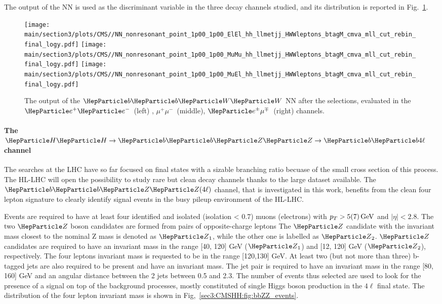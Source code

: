 The output of the NN is used as the discriminant variable in the three decay channels studied, and its distribution is reported in Fig.~\ref{sec3:CMSHH:fig:bbWW_events}.

\begin{figure}[!htb]
  \begin{center}
    \texttt{[image: \\main/section3/plots/CMS//NN\_nonresonant\_point\_1p00\_1p00\_ElEl\_hh\_llmetjj\_HWWleptons\_btagM\_cmva\_mll\_cut\_rebin\_final\_logy.pdf]}
    \texttt{[image: \\main/section3/plots/CMS//NN\_nonresonant\_point\_1p00\_1p00\_MuMu\_hh\_llmetjj\_HWWleptons\_btagM\_cmva\_mll\_cut\_rebin\_final\_logy.pdf]}
    \texttt{[image: \\main/section3/plots/CMS//NN\_nonresonant\_point\_1p00\_1p00\_MuEl\_hh\_llmetjj\_HWWleptons\_btagM\_cmva\_mll\_cut\_rebin\_final\_logy.pdf]}
    \caption{
      The output of the $\bbWW$ NN after the selections, evaluated in the
      $\Pe^{+}\Pe^{-}$~(left) , $\mu^{+}\mu^{-}$~(middle),
      $\Pe^{\pm}\mu^{\mp}$~(right) channels.
    }
    \label{sec3:CMSHH:fig:bbWW_events}
  \end{center}
\end{figure}


\paragraph{The $\HH\to\bbZZ\to \PQb\PQb 4\ell$ channel}

The \HH searches at the LHC have so far focused on final states with a sizable branching ratio becuase of the small cross section of this process.
The HL-LHC will open the possibility to study rare but clean decay channels thanks to the large dataset available.
The $\bbZZ(4\ell)$ channel, that is investigated in this work, benefits from the clean four lepton signature to clearly identify signal events in the busy pileup environment of the HL-LHC.

Events are required to have at least four identified and isolated (isolation < 0.7) muons (electrons) with $p_{T} > 5(7)\,\text{Ge\hspace{-.08em}V}$ and $|\eta|< 2.8$. 
The two $\PZ$ boson candidates are formed from pairs of opposite-charge leptons
The $\PZ$ candidate with the invariant mass closest to the nominal Z mass is denoted as $\PZ_1$, while the other one is labelled as $\PZ_2$.
$\PZ$ candidates are required to have an invariant mass in the range [40, 120] GeV ($\PZ_1$) and [12, 120] GeV ($\PZ_2$), respectively.
The four leptons invariant mass is requested to be in the range [120,130] GeV.
At least two (but not more than three) b-tagged jets are also required to be  present  and have an invariant mass.
The jet pair is required to have an invariant mass in the range [80, 160] GeV and an angular distance between the 2 jets between 0.5 and 2.3.
The number of events thus selected are used to look for the presence of a signal on top of the background processes, mostly constituted of single Higgs boson production in the $4\ell$ final state.
The distribution of the four lepton invariant mass is shown in  Fig,~\ref{sec3:CMSHH:fig:bbZZ_events}.


